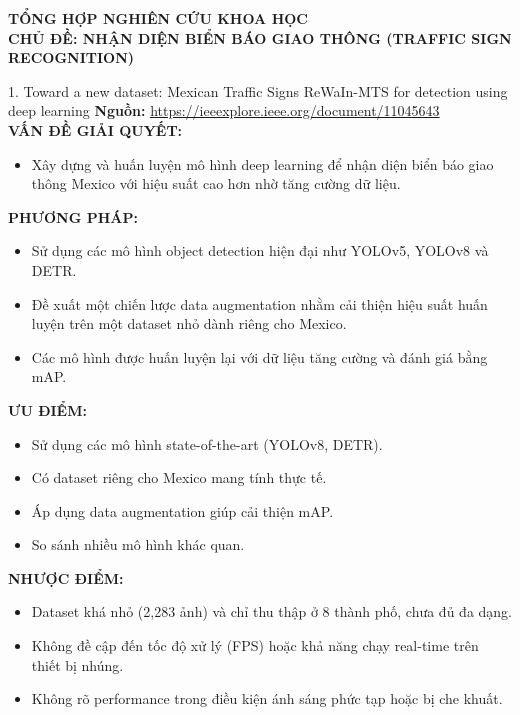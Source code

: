 \documentclass[12pt,a4paper]{article}
\newcommand{\subheading}[1]{\vspace{0.3cm}\noindent\textbf{\textcolor{primary}{\MakeUppercase{#1}:}}\par\vspace{0.1cm}}
\begin{document}
\begin{center}
    {\huge\bfseries\color{primary} TỔNG HỢP NGHIÊN CỨU KHOA HỌC}\\[0.5cm]
    {\Large\bfseries CHỦ ĐỀ: NHẬN DIỆN BIỂN BÁO GIAO THÔNG (TRAFFIC SIGN RECOGNITION)}\\[1cm]
\end{center}

\begin{paperbox}{1. Toward a new dataset: Mexican Traffic Signs ReWaIn-MTS for detection using deep learning}
    \textbf{Nguồn:} \url{https://ieeexplore.ieee.org/document/11045643}\\

    \subheading{Vấn đề giải quyết}
    \begin{itemize}
        \item Xây dựng và huấn luyện mô hình deep learning để nhận diện biển báo giao thông Mexico với hiệu suất cao hơn nhờ tăng cường dữ liệu.
    \end{itemize}

    \subheading{Phương pháp}
    \begin{itemize}
        \item Sử dụng các mô hình object detection hiện đại như YOLOv5, YOLOv8 và DETR.
        \item Đề xuất một chiến lược data augmentation nhằm cải thiện hiệu suất huấn luyện trên một dataset nhỏ dành riêng cho Mexico.
        \item Các mô hình được huấn luyện lại với dữ liệu tăng cường và đánh giá bằng mAP.
    \end{itemize}

    \subheading{Ưu điểm}
    \begin{itemize}
        \item Sử dụng các mô hình state-of-the-art (YOLOv8, DETR).
        \item Có dataset riêng cho Mexico mang tính thực tế.
        \item Áp dụng data augmentation giúp cải thiện mAP.
        \item So sánh nhiều mô hình khác quan.
    \end{itemize}

    \subheading{Nhược điểm}
    \begin{itemize}
        \item Dataset khá nhỏ (2,283 ảnh) và chỉ thu thập ở 8 thành phố, chưa đủ đa dạng.
        \item Không đề cập đến tốc độ xử lý (FPS) hoặc khả năng chạy real-time trên thiết bị nhúng.
        \item Không rõ performance trong điều kiện ánh sáng phức tạp hoặc bị che khuất.
    \end{itemize}


\end{paperbox}
\end{document}
